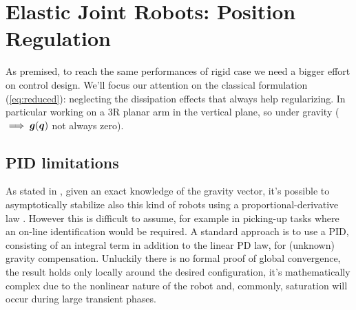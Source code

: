 \section{Elastic Joint Robots: Position Regulation}
As premised, to reach the same performances of rigid case we need a bigger effort on control design. We'll focus our attention on the classical formulation (\ref{eq:reduced}): neglecting the dissipation effects that always help regularizing. In particular working on a 3R planar arm in the vertical plane, so under gravity ($\implies \boldsymbol{g}({\boldsymbol{q}})$ not always zero). 
\subsection{PID limitations}
As stated in \cite{deluca93}, given an exact knowledge of the gravity vector, it's possible to asymptotically stabilize also this kind of robots using a proportional-derivative law \cite{simplepd}. However this is difficult to assume, for example in picking-up tasks where an on-line identification would be required. A standard approach is to use a PID, consisting of an integral term in addition to the linear PD law, for (unknown) gravity compensation. Unluckily there is no formal proof of global convergence, the result holds only locally around the desired configuration, it's mathematically complex due to the nonlinear nature of the robot and, commonly, saturation will occur during large transient phases.
